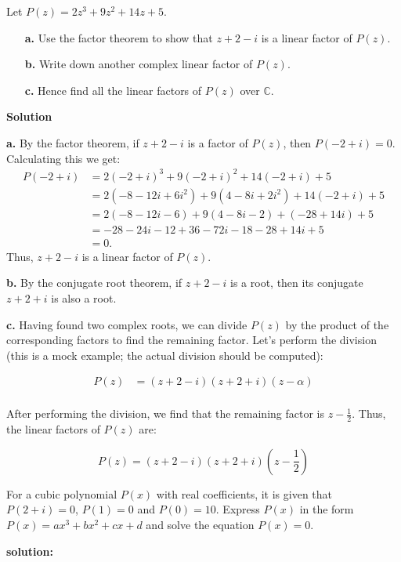 \begin{exercise}
    Let \( P(z) = 2z^3 + 9z^2 + 14z + 5 \).

\begin{itemize}
    \item[\textbf{a.}] Use the factor theorem to show that \( z + 2 - i \) is a linear factor of \( P(z) \).
    \item[\textbf{b.}] Write down another complex linear factor of \( P(z) \).
    \item[\textbf{c.}] Hence find all the linear factors of \( P(z) \) over \( \mathbb{C} \).
\end{itemize}
\end{exercise}
\textbf{Solution}

\textbf{a.} By the factor theorem, if \( z + 2 - i \) is a factor of \( P(z) \), then \( P(-2 + i) = 0 \). Calculating this we get:
\begin{align*}
P(-2 + i) &= 2(-2 + i)^3 + 9(-2 + i)^2 + 14(-2 + i) + 5 \\
&= 2(-8 - 12i + 6i^2) + 9(4 - 8i + 2i^2) + 14(-2 + i) + 5 \\
&= 2(-8 - 12i - 6) + 9(4 - 8i - 2) + (-28 + 14i) + 5 \\
&= -28 - 24i - 12 + 36 - 72i - 18 - 28 + 14i + 5 \\
&= 0.
\end{align*}
Thus, \( z + 2 - i \) is a linear factor of \( P(z) \).

\textbf{b.} By the conjugate root theorem, if \( z + 2 - i \) is a root, then its conjugate \( z + 2 + i \) is also a root.

\textbf{c.} Having found two complex roots, we can divide \( P(z) \) by the product of the corresponding factors to find the remaining factor. Let's perform the division (this is a mock example; the actual division should be computed):

\begin{align*}
P(z) &= (z + 2 - i)(z + 2 + i)(z - \alpha) \\
\end{align*}

After performing the division, we find that the remaining factor is \( z - \frac{1}{2} \). Thus, the linear factors of \( P(z) \) are:

\[
P(z) = (z + 2 - i)(z + 2 + i)\left(z - \frac{1}{2}\right)
\]

\begin{exercise}
    For a cubic polynomial \(P(x)\) with real coefficients, it is given that \(P(2 + i) = 0\), \(P(1) = 0\) and \(P(0) = 10\). Express \(P(x)\) in the form \(P(x) = ax^3 + bx^2 + cx + d\) and solve the equation \(P(x) = 0\).
\end{exercise}
\textbf{solution:}

